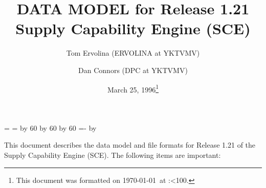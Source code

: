 \topmargin 0.0in
\headheight 0.0in
\headsep 0.0in
\textwidth 7.5in
\oddsidemargin -0.5in
\textheight 9in
\newcount\hh
\newcount\mm

\mm=\time
\hh=\time
\divide\hh by 60
\divide\mm by 60
\multiply\mm by 60
\mm=-\mm
\advance\mm by \time
\def\hhmm{\number\hh:\ifnum\mm<10{}0\fi\number\mm}


\title{DATA MODEL for Release 1.21  Supply Capability Engine (SCE)}
\author{Tom Ervolina (ERVOLINA at YKTVMV) \and Dan Connors  (DPC at YKTVMV)}
\date{March 25, 1996\footnote[2]{This document was 
formatted on \today\ at \hhmm.}}
\maketitle
This document describes the data model and file formats 
for Release 1.21 of the Supply Capability 
Engine (SCE).  The following items are important:
